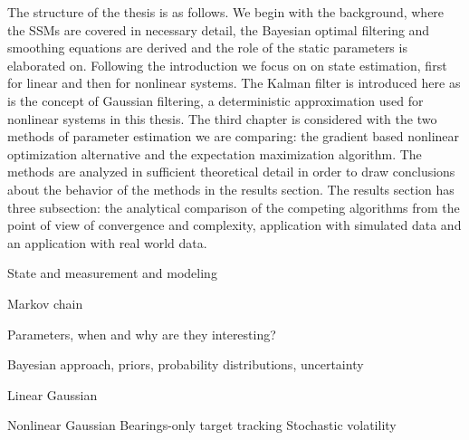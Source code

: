 The structure of the thesis is as follows. We begin with the background, where
the SSMs are covered in necessary detail, the Bayesian optimal filtering
and smoothing equations are derived and the role of the static parameters is elaborated
on. Following the introduction we focus on on state estimation, first for linear
and then for nonlinear systems. The Kalman filter is introduced here as is the
concept of Gaussian filtering, a deterministic approximation used for nonlinear systems 
in this thesis. The third chapter is considered with the two methods
of parameter estimation we are comparing: the gradient based nonlinear optimization alternative
and the expectation maximization algorithm. The methods are analyzed in sufficient
theoretical detail in order to draw conclusions about the behavior of the methods
in the results section. The results section has three subsection: the analytical 
comparison of the competing algorithms from the point of view of convergence
and complexity, application with simulated data and an application with real world data.

State and measurement and modeling

Markov chain

Parameters, when and why are they interesting?

Bayesian approach, priors, probability distributions, uncertainty

Linear Gaussian 
  


Nonlinear Gaussian
  Bearings-only target tracking
  Stochastic volatility



 

